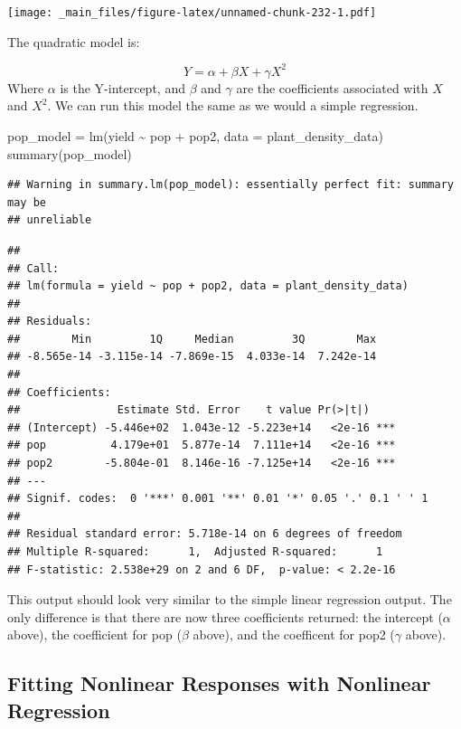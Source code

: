 \documentclass[
]{book}
\newenvironment{Shaded}{\begin{snugshade}}{\end{snugshade}}
\newcommand{\AttributeTok}[1]{\textcolor[rgb]{0.77,0.63,0.00}{#1}}
\newcommand{\FunctionTok}[1]{\textcolor[rgb]{0.00,0.00,0.00}{#1}}
\newcommand{\NormalTok}[1]{#1}
\newcommand{\OtherTok}[1]{\textcolor[rgb]{0.56,0.35,0.01}{#1}}
\newcommand{\SpecialCharTok}[1]{\textcolor[rgb]{0.00,0.00,0.00}{#1}}
\begin{document}
\texttt{[image: \_main\_files/figure-latex/unnamed-chunk-232-1.pdf]}

The quadratic model is:

\[ Y = \alpha + \beta X + \gamma X^2\]
Where \(\alpha\) is the Y-intercept, and \(\beta\) and \(\gamma\) are the coefficients associated with \(X\) and \(X^2\). We can run this model the same as we would a simple regression.

\begin{Shaded}
\begin{Highlighting}[]
\NormalTok{pop\_model }\OtherTok{=} \FunctionTok{lm}\NormalTok{(yield }\SpecialCharTok{\textasciitilde{}}\NormalTok{ pop }\SpecialCharTok{+}\NormalTok{ pop2, }\AttributeTok{data =}\NormalTok{ plant\_density\_data)}
\FunctionTok{summary}\NormalTok{(pop\_model)}
\end{Highlighting}
\end{Shaded}

\begin{verbatim}
## Warning in summary.lm(pop_model): essentially perfect fit: summary may be
## unreliable
\end{verbatim}

\begin{verbatim}
## 
## Call:
## lm(formula = yield ~ pop + pop2, data = plant_density_data)
## 
## Residuals:
##        Min         1Q     Median         3Q        Max 
## -8.565e-14 -3.115e-14 -7.869e-15  4.033e-14  7.242e-14 
## 
## Coefficients:
##               Estimate Std. Error    t value Pr(>|t|)    
## (Intercept) -5.446e+02  1.043e-12 -5.223e+14   <2e-16 ***
## pop          4.179e+01  5.877e-14  7.111e+14   <2e-16 ***
## pop2        -5.804e-01  8.146e-16 -7.125e+14   <2e-16 ***
## ---
## Signif. codes:  0 '***' 0.001 '**' 0.01 '*' 0.05 '.' 0.1 ' ' 1
## 
## Residual standard error: 5.718e-14 on 6 degrees of freedom
## Multiple R-squared:      1,  Adjusted R-squared:      1 
## F-statistic: 2.538e+29 on 2 and 6 DF,  p-value: < 2.2e-16
\end{verbatim}

This output should look very similar to the simple linear regression output. The only difference is that there are now three coefficients returned: the intercept (\(\alpha\) above), the coefficient for pop (\(\beta\) above), and the coefficent for pop2 (\(\gamma\) above).

\hypertarget{fitting-nonlinear-responses-with-nonlinear-regression}{%
\subsection{Fitting Nonlinear Responses with Nonlinear Regression}\label{fitting-nonlinear-responses-with-nonlinear-regression}}
\end{document}
